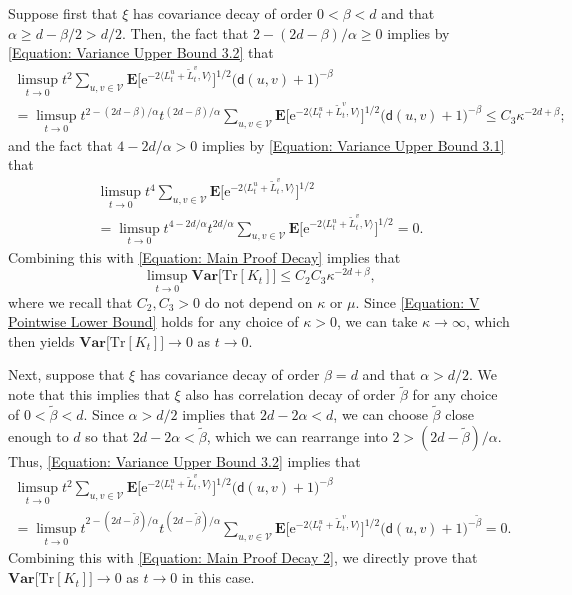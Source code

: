 \documentclass{amsart}
\numberwithin{equation}{section}
\theoremstyle{definition}
\newcommand\al{\alpha}
\newcommand\be{\beta}
\newcommand\ka{\kappa}
\newcommand\mbf{\mathbf}
\newcommand\mr{\mathrm}
\newcommand\ms{\mathscr}
\newcommand\msf{\mathsf}
\begin{document}
Suppose first that $\xi$ has covariance decay of order $0<\be<d$ and that $\al\geq d-\be/2>d/2$. Then,
the fact that $2-(2d-\be)/\al\geq0$ implies by \eqref{Equation: Variance Upper Bound 3.2} that
\begin{multline*}
\limsup_{t\to0}t^2\sum_{u,v\in\ms V}\mbf E\Big[\mr e^{-2\langle L^u_t+\tilde L^v_t,V\rangle}\Big]^{1/2}\big(\msf d(u,v)+1\big)^{-\be}\\
=\limsup_{t\to0}t^{2-(2d-\be)/\al}t^{(2d-\be)/\al}\sum_{u,v\in\ms V}\mbf E\Big[\mr e^{-2\langle L^u_t+\tilde L^v_t,V\rangle}\Big]^{1/2}\big(\msf d(u,v)+1\big)^{-\be}
\leq C_3\ka^{-2d+\be};
\end{multline*}
and the fact that $4-2d/\al>0$ implies by \eqref{Equation: Variance Upper Bound 3.1} that
\begin{multline}
\label{Equation: Main Proof Decay 2}
\limsup_{t\to0}t^4\sum_{u,v\in\ms V}\mbf E\Big[\mr e^{-2\langle L^u_t+\tilde L^v_t,V\rangle}\Big]^{1/2}\\
=\limsup_{t\to0}t^{4-2d/\al}t^{2d/\al}\sum_{u,v\in\ms V}\mbf E\Big[\mr e^{-2\langle L^u_t+\tilde L^v_t,V\rangle}\Big]^{1/2}
=0.
\end{multline}
Combining this with \eqref{Equation: Main Proof Decay} implies that
\[\limsup_{t\to0}\mbf{Var}\big[\mr{Tr}[K_t]\big]\leq C_2C_3\ka^{-2d+\be},\]
where we recall that $C_2,C_3>0$ do not depend on $\ka$ or $\mu$. Since
\eqref{Equation: V Pointwise Lower Bound} holds for any choice of $\ka>0$, we can take
$\ka\to\infty$, which then yields $\mbf{Var}\big[\mr{Tr}[K_t]\big]\to0$ as $t\to0$.

%

Next, suppose that $\xi$ has covariance decay of order $\be=d$ and that $\al>d/2$.
We note that this implies that $\xi$ also has correlation
decay of order $\tilde\be$ for any choice of $0<\tilde\be<d$.
Since $\al>d/2$ implies that $2d-2\al<d$, we can choose $\tilde\be$ close enough to
$d$ so that
$2d-2\al<\tilde\be$, which we can rearrange into $2>(2d-\tilde\be)/\al$.
Thus, \eqref{Equation: Variance Upper Bound 3.2} implies that
\begin{multline*}
\limsup_{t\to0}t^2\sum_{u,v\in\ms V}\mbf E\Big[\mr e^{-2\langle L^u_t+\tilde L^v_t,V\rangle}\Big]^{1/2}\big(\msf d(u,v)+1\big)^{-\be}\\
=\limsup_{t\to0}t^{2-(2d-\tilde\be)/\al}t^{(2d-\tilde\be)/\al}\sum_{u,v\in\ms V}\mbf E\Big[\mr e^{-2\langle L^u_t+\tilde L^v_t,V\rangle}\Big]^{1/2}\big(\msf d(u,v)+1\big)^{-\tilde\be}
=0.
\end{multline*}
Combining this with \eqref{Equation: Main Proof Decay 2}, we directly prove
that $\mbf{Var}\big[\mr{Tr}[K_t]\big]\to0$ as $t\to0$ in this case.
\end{document}
